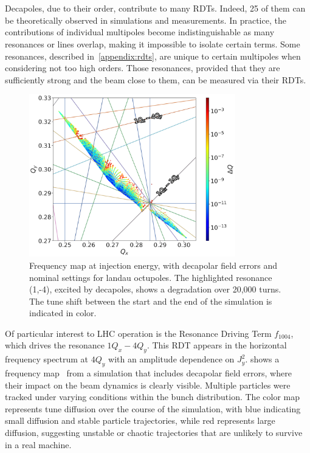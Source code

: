 \section{}

Decapoles, due to their order, contribute to many RDTs. Indeed, 25 of them can be theoretically 
observed in simulations and measurements. In practice, the contributions of individual multipoles
become indistinguishable as many resonances or lines overlap, making it impossible to isolate
certain terms. Some resonances, described in~\cref{appendix:rdts}, are unique to certain multipoles
when considering not too high orders. Those resonances, provided that they are sufficiently strong
and the beam close to them, can be measured via their RDTs.

\begin{figure}[!htb]
    \centering
    \includegraphics[width=0.8\textwidth]{./images/tune_diagram_f1004.pdf}
    \caption{Frequency map at injection energy, with decapolar field errors and nominal settings for
    landau octupoles. The highlighted resonance (1,-4), excited by decapoles, shows a degradation
    over 20,000 turns. The tune shift between the start and the end of the simulation is indicated
    in color.}
    \label{fig:decapoles:rdts:tune_diagram}
\end{figure}

Of particular interest to LHC operation is the Resonance Driving Term $f_{1004}$, which drives
the resonance $1Q_x - 4Q_y$. This RDT appears in the horizontal frequency spectrum at $4Q_y$ with
an amplitude dependence on $J_y^2$. 
 shows a frequency
map~\cite{yannis_papaphilippou_detecting_2014} from a simulation that includes decapolar field
errors, where their impact on the beam dynamics is clearly visible. Multiple particles were tracked
under varying conditions within the bunch distribution. The color map represents tune diffusion over
the course of the simulation, with blue indicating small diffusion and stable particle trajectories,
while red represents large diffusion, suggesting unstable or chaotic trajectories that are unlikely
to survive in a real machine.

